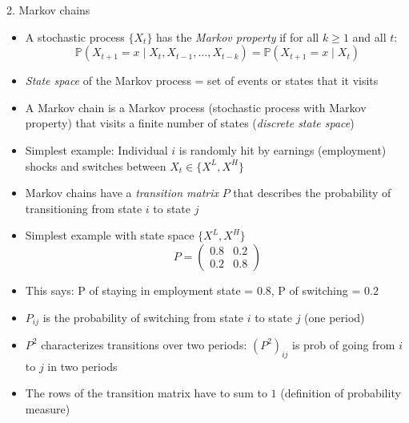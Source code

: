 \documentclass[10pt]{beamer}
\begin{document}
\begin{frame}{2. Markov chains}
\begin{itemize}
\item A stochastic process $\{X_t\}$ has the \textit{Markov property} if for all $k \geq 1$ and all $t$:
\begin{equation*}
	\mathbb P(X_{t+1} = x \mid X_t, X_{t-1}, \ldots, X_{t-k}) = \mathbb P(X_{t+1} = x \mid X_t)
\end{equation*}

\item \textit{State space} of the Markov process = set of events or states that it visits 

\item A Markov chain is a Markov process (stochastic process with Markov property) that visits a finite number of states (\textit{discrete state space})

\item Simplest example: Individual $i$ is randomly hit by earnings (employment) shocks and switches between $X_t \in \{X^L, X^H\}$
\end{itemize}
\end{frame}


\begin{frame}{}
\begin{itemize}
\item Markov chains have a \textit{transition matrix} $P$ that describes the probability of transitioning from state $i$ to state $j$

\item Simplest example with state space $\{X^L, X^H\}$
\begin{equation*}
	P = \begin{pmatrix} 0.8 & 0.2 \\ 0.2 & 0.8 \end{pmatrix}
\end{equation*}

\item This says: P of staying in employment state = $0.8$, P of switching = $0.2$

\item $P_{ij}$ is the probability of switching from state $i$ to state $j$ (one period)

\item $P^2$ characterizes transitions over two periods: $(P^2)_{ij}$ is prob of going from $i$ to $j$ in two periods

\item The rows of the transition matrix have to sum to $1$ (definition of probability measure)
\end{itemize}
\end{frame}
\end{document}

